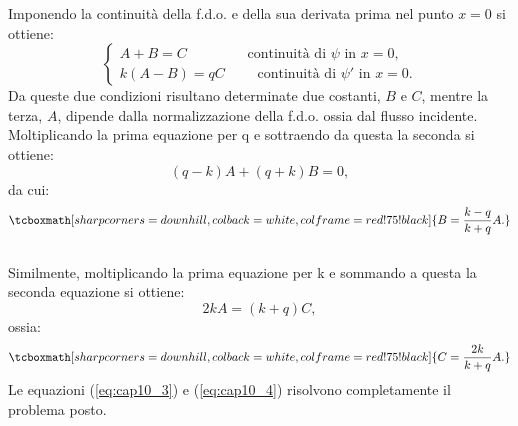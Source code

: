 Imponendo la continuità della f.d.o. e della sua derivata prima nel punto $x=0$ si ottiene:
	\begin{equation}
		\begin{cases}
		A+B=C \quad \qquad \quad \textrm{ continuità di }\psi\textrm{ in }x=0,\\
		k\left(A-B \right) =qC\qquad \textrm{ continuità di }\psi '\textrm{ in }x=0.
		\end{cases}
	\end{equation}
Da queste due condizioni risultano determinate due costanti, $B$ e $C$, mentre la terza, $A$, dipende dalla normalizzazione della f.d.o. ossia dal flusso incidente.\\

Moltiplicando la prima equazione per q e sottraendo da questa la seconda si ottiene:
	\begin{equation}
		\left( q-k \right) A + \left( q+k \right)B=0,
	\end{equation}
da cui:
	\begin{equation}
		\tcboxmath[sharp corners=downhill, colback=white, colframe=red!75!black]{
			B= \frac{k-q}{k+q}A.
			}
	\label{eq:cap10_3}
	\end{equation}\\
	
Similmente, moltiplicando la prima equazione per k e sommando a questa la seconda equazione si ottiene:
	\begin{equation}
		2kA=\left( k+q \right)C,
	\end{equation}
ossia:
	\begin{equation}
		\tcboxmath[sharp corners=downhill, colback=white, colframe=red!75!black]{
			C=\frac{2k}{k+q}A.
			}
	\label{eq:cap10_4}
	\end{equation}
Le equazioni (\ref{eq:cap10_3}) e (\ref{eq:cap10_4}) risolvono completamente il problema posto.\\

